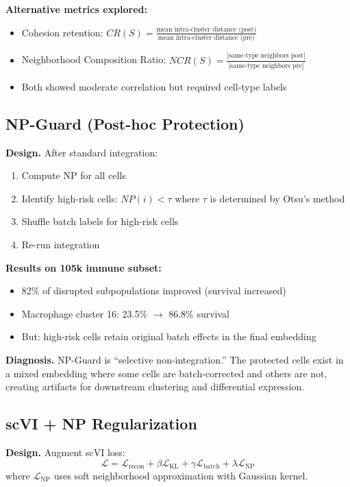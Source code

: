 \documentclass[10pt]{article}
\begin{document}
\textbf{Alternative metrics explored:}
\begin{itemize}
\item Cohesion retention: $CR(S) = \frac{\text{mean intra-cluster distance (post)}}{\text{mean intra-cluster distance (pre)}}$
\item Neighborhood Composition Ratio: $NCR(S) = \frac{|\text{same-type neighbors post}|}{|\text{same-type neighbors pre}|}$
\item Both showed moderate correlation but required cell-type labels
\end{itemize}

\subsection{NP-Guard (Post-hoc Protection)}

\textbf{Design.} After standard integration:
\begin{enumerate}
\item Compute NP for all cells
\item Identify high-risk cells: $NP(i) < \tau$ where $\tau$ is determined by Otsu's method
\item Shuffle batch labels for high-risk cells
\item Re-run integration
\end{enumerate}

\textbf{Results on 105k immune subset:}
\begin{itemize}
\item 82\% of disrupted subpopulations improved (survival increased)
\item Macrophage cluster 16: 23.5\% $\to$ 86.8\% survival
\item But: high-risk cells retain original batch effects in the final embedding
\end{itemize}

\textbf{Diagnosis.} NP-Guard is ``selective non-integration.'' The protected cells exist in a mixed embedding where some cells are batch-corrected and others are not, creating artifacts for downstream clustering and differential expression.

\subsection{scVI + NP Regularization}

\textbf{Design.} Augment scVI loss:
$$\mathcal{L} = \mathcal{L}_{\text{recon}} + \beta \mathcal{L}_{\text{KL}} + \gamma \mathcal{L}_{\text{batch}} + \lambda \mathcal{L}_{\text{NP}}$$
where $\mathcal{L}_{\text{NP}}$ uses soft neighborhood approximation with Gaussian kernel.
\end{document}
